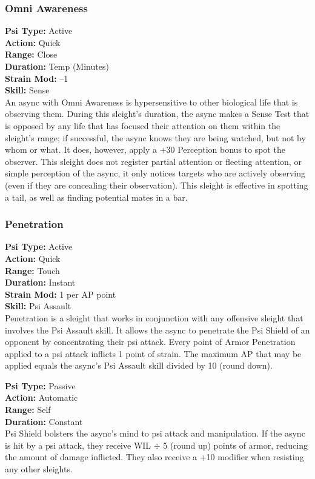 \subsubsection{Omni Awareness} \textbf{Psi Type:} Active \\ \textbf{Action:} Quick \\ \textbf{Range:} Close \\ \textbf{Duration:} Temp (Minutes) \\ \textbf{Strain Mod:} –1 \\ \textbf{Skill:} Sense\\ An async with Omni Awareness is hypersensitive to other biological life that is observing them. During this sleight’s duration, the async makes a Sense Test that is opposed by any life that has focused their attention on them within the sleight’s range; if successful, the async knows they are being watched, but not by whom or what. It does, however, apply a +30 Perception bonus to spot the observer. This sleight does not register partial attention or fleeting attention, or simple perception of the async, it only notices targets who are actively observing (even if they are concealing their observation). This sleight is effective in spotting a tail, as well as finding potential mates in a bar. 

\subsubsection{Penetration} \textbf{Psi Type:} Active \\ \textbf{Action:} Quick \\ \textbf{Range:} Touch \\ \textbf{Duration:} Instant \\ \textbf{Strain Mod:} 1 per AP point \\ \textbf{Skill:} Psi Assault \\ Penetration is a sleight that works in conjunction with any offensive sleight that involves the Psi Assault skill. It allows the async to penetrate the Psi Shield of an opponent by concentrating their psi attack. Every point of Armor Penetration applied to a psi attack inflicts 1 point of strain. The maximum AP that may be applied equals the async’s Psi Assault skill divided by 10 (round down). 

 \textbf{Psi Type:} Passive \\ \textbf{Action:} Automatic \\ \textbf{Range:} Self \\ \textbf{Duration:} Constant \\ Psi Shield bolsters the async’s mind to psi attack and manipulation. If the async is hit by a psi attack, they receive WIL $\div$ 5 (round up) points of armor, reducing the amount of damage inflicted. They also receive a +10 modifier when resisting any other sleights. 

